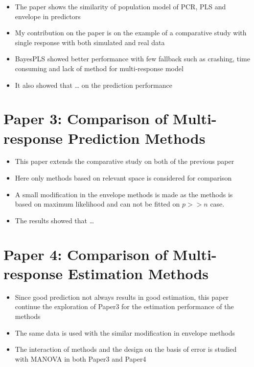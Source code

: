 \documentclass[11pt,twoside,openright,titlepage,
  headinclude,footinclude,BCOR=5mm,
  numbers=noenddot,cleardoublepage=empty,
  tablecaptionabove, dottedtoc,
  bibliography=totoc]{scrreprt}
\providecommand{\tightlist}{%
  \setlength{\itemsep}{0pt}\setlength{\parskip}{0pt}}
\begin{document}
\begin{itemize}
\tightlist
\item
  The paper shows the similarity of population model of PCR, PLS and envelope in predictors
\item
  My contribution on the paper is on the example of a comparative study with single response with both simulated and real data
\item
  BayesPLS showed better performance with few fallback such as crashing, time consuming and lack of method for multi-response model
\item
  It also showed that \ldots{} on the prediction performance
\end{itemize}

\hypertarget{paper-3-comparison-of-multi-response-prediction-methods}{%
\section{Paper 3: Comparison of Multi-response Prediction Methods}\label{paper-3-comparison-of-multi-response-prediction-methods}}

\begin{itemize}
\tightlist
\item
  This paper extends the comparative study on both of the previous paper
\item
  Here only methods based on relevant space is considered for comparison
\item
  A small modification in the envelope methods is made as the methods is based on maximum likelihood and can not be fitted on \(p>>n\) case.
\item
  The results showed that \ldots{}
\end{itemize}

\hypertarget{paper-4-comparison-of-multi-response-estimation-methods}{%
\section{Paper 4: Comparison of Multi-response Estimation Methods}\label{paper-4-comparison-of-multi-response-estimation-methods}}

\begin{itemize}
\tightlist
\item
  Since good prediction not always results in good estimation, this paper continue the exploration of Paper3 for the estimation performance of the methods
\item
  The same data is used with the similar modification in envelope methods
\item
  The interaction of methods and the design on the basis of error is studied with MANOVA in both Paper3 and Paper4
\end{itemize}
\end{document}
